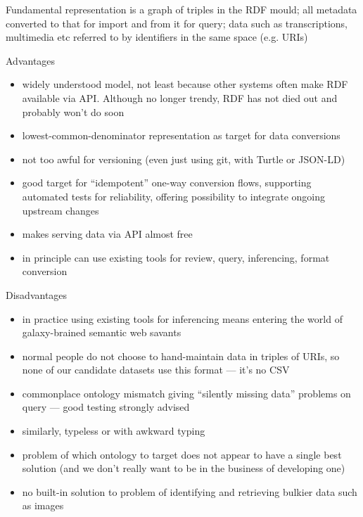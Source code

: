 \documentclass[sigconf, nonacm=true]{acmart}
\begin{document}
\begin{sloppypar}
  Fundamental representation is a graph of triples in the RDF mould;
  all metadata converted to that for import and from it for query;
  data such as transcriptions, multimedia etc referred to by
  identifiers in the same space (e.g. URIs)

  Advantages

  \begin{itemize}
    \item widely understood model, not least because other systems
      often make RDF available via API. Although no longer trendy, RDF
      has not died out and probably won't do soon
    \item lowest-common-denominator representation as target for data
      conversions
    \item not too awful for versioning (even just using git, with
      Turtle or JSON-LD)
    \item good target for ``idempotent'' one-way conversion flows,
      supporting automated tests for reliability, offering possibility
      to integrate ongoing upstream changes
    \item makes serving data via API almost free
    \item in principle can use existing tools for review, query,
      inferencing, format conversion
  \end{itemize}

  Disadvantages

  \begin{itemize}
    \item in practice using existing tools for inferencing means
      entering the world of galaxy-brained semantic web savants
    \item normal people do not choose to hand-maintain data in triples
      of URIs, so none of our candidate datasets use this format ---
      it's no CSV
    \item commonplace ontology mismatch giving ``silently missing
      data'' problems on query --- good testing strongly advised
    \item similarly, typeless or with awkward typing
    \item problem of which ontology to target does not appear to have
      a single best solution (and we don't really want to be in the
      business of developing one)
    \item no built-in solution to problem of identifying and
      retrieving bulkier data such as images
  \end{itemize}


\end{sloppypar}
\end{document}
